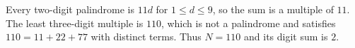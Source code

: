 Every two-digit palindrome is $11d$ for $1\le d\le9$, so the sum is a multiple of $11$. The least three-digit multiple is $110$, which is not a palindrome and satisfies $110=11+22+77$ with distinct terms. Thus $N=110$ and its digit sum is $\boxed2$.
